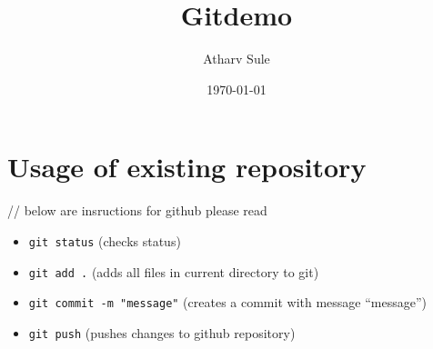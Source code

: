 \documentclass[11pt]{article}
\author{Atharv Sule}
\date{\today}
\title{Gitdemo}
\begin{document}
\maketitle
\tableofcontents



\section{Usage of existing repository}
\label{sec:org068c7a6}


// below are insructions for github please read
\begin{itemize}
\item \texttt{git status}  (checks status)
\item \texttt{git add .} (adds all files in current directory to git)
\item \texttt{git commit -m "message"} (creates a commit with message ``message'')
\item \texttt{git push} (pushes changes to github repository)
\end{itemize}
\end{document}
